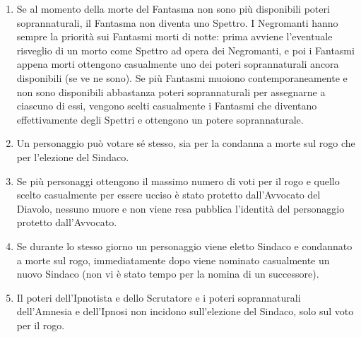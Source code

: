 \documentclass[a4paper,10pt]{article}
\begin{document}
\begin{enumerate}
 \item Se al momento della morte del Fantasma non sono più disponibili poteri
soprannaturali, il Fantasma non diventa uno Spettro.
 I Negromanti hanno sempre la priorità sui Fantasmi morti di notte: prima
avviene l'eventuale risveglio di un morto come Spettro ad opera dei Negromanti,
e poi i Fantasmi appena morti ottengono casualmente uno dei poteri
soprannaturali ancora disponibili (se ve ne sono).
 Se più Fantasmi muoiono contemporaneamente e non sono disponibili abbastanza
poteri soprannaturali per assegnarne a ciascuno di essi, vengono scelti
casualmente i Fantasmi che diventano effettivamente degli Spettri e ottengono un
potere soprannaturale.
 
 \item Un personaggio può votare sé stesso, sia per la condanna a morte sul rogo
che per l'elezione del Sindaco.
 
 \vspace{-4 mm}
 \item Se più personaggi ottengono il massimo numero di voti per il rogo e
quello scelto casualmente per essere ucciso è stato protetto dall'Avvocato del
Diavolo, nessuno muore e non viene resa pubblica l'identità del personaggio
protetto dall'Avvocato.
 
 \item Se durante lo stesso giorno un personaggio viene eletto Sindaco e
condannato a morte sul rogo, immediatamente dopo viene nominato casualmente un
nuovo Sindaco (non vi è stato tempo per la nomina di un successore).
 
 \item Il poteri dell'Ipnotista e dello Scrutatore e i poteri soprannaturali dell'Amnesia e dell'Ipnosi
 non incidono sull'elezione del Sindaco, solo sul voto per il rogo.
 
 

\end{enumerate}
\end{document}
